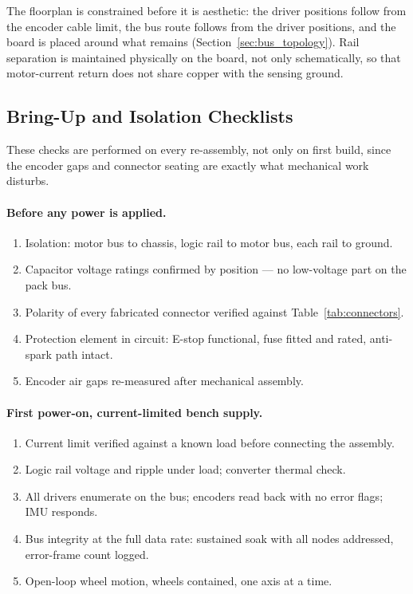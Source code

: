 The floorplan is constrained before it is aesthetic: the driver positions follow
from the encoder cable limit, the bus route follows from the driver positions,
and the board is placed around what remains
(Section~\ref{sec:bus_topology}). Rail separation is maintained physically on
the board, not only schematically, so that motor-current return does not share
copper with the sensing ground.

\subsection{Bring-Up and Isolation Checklists}
\label{app:checklists}

These checks are performed on every re-assembly, not only on first build, since
the encoder gaps and connector seating are exactly what mechanical work
disturbs.

\paragraph{Before any power is applied.}
\begin{enumerate}
  \item Isolation: motor bus to chassis, logic rail to motor bus, each rail to
        ground.
  \item Capacitor voltage ratings confirmed by position --- no low-voltage part
        on the pack bus.
  \item Polarity of every fabricated connector verified against
        Table~\ref{tab:connectors}.
  \item Protection element in circuit: E-stop functional, fuse fitted and rated,
        anti-spark path intact.
  \item Encoder air gaps re-measured after mechanical assembly.
\end{enumerate}

\paragraph{First power-on, current-limited bench supply.}
\begin{enumerate}
  \item Current limit verified against a known load before connecting the
        assembly.
  \item Logic rail voltage and ripple under load; converter thermal check.
  \item All drivers enumerate on the bus; encoders read back with no error
        flags; IMU responds.
  \item Bus integrity at the full data rate: sustained soak with all nodes
        addressed, error-frame count logged.
  \item Open-loop wheel motion, wheels contained, one axis at a time.
\end{enumerate}

